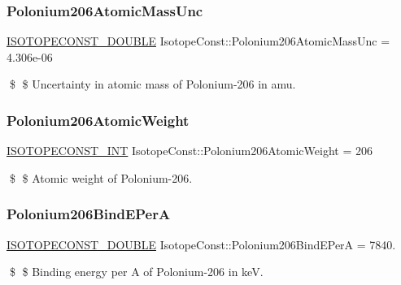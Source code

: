 \subsubsection{\texorpdfstring{Polonium206\+Atomic\+Mass\+Unc}{Polonium206AtomicMassUnc}}
{\footnotesize\ttfamily \mbox{\hyperlink{group___isotope_const-_macros_ga8f45a7272ce02c0b4c65c44636ed719a}{I\+S\+O\+T\+O\+P\+E\+C\+O\+N\+S\+T\+\_\+\+D\+O\+U\+B\+LE}} Isotope\+Const\+::\+Polonium206\+Atomic\+Mass\+Unc = 4.\+306e-\/06}

\$ \$ Uncertainty in atomic mass of Polonium-\/206 in amu. \mbox{\label{group___isotope_const-_polonium-_po206_ga55873615923500a46ce5d4bd2b4f03e9}} 
\subsubsection{\texorpdfstring{Polonium206\+Atomic\+Weight}{Polonium206AtomicWeight}}
{\footnotesize\ttfamily \mbox{\hyperlink{group___isotope_const-_macros_ga5f18360b3e99483a35c32d789e62621c}{I\+S\+O\+T\+O\+P\+E\+C\+O\+N\+S\+T\+\_\+\+I\+NT}} Isotope\+Const\+::\+Polonium206\+Atomic\+Weight = 206}

\$ \$ Atomic weight of Polonium-\/206. \mbox{\label{group___isotope_const-_polonium-_po206_gaf8ec9079da7ca5d24fc6d564b37ed29b}} 
\subsubsection{\texorpdfstring{Polonium206\+Bind\+E\+PerA}{Polonium206BindEPerA}}
{\footnotesize\ttfamily \mbox{\hyperlink{group___isotope_const-_macros_ga8f45a7272ce02c0b4c65c44636ed719a}{I\+S\+O\+T\+O\+P\+E\+C\+O\+N\+S\+T\+\_\+\+D\+O\+U\+B\+LE}} Isotope\+Const\+::\+Polonium206\+Bind\+E\+PerA = 7840.}

\$ \$ Binding energy per A of Polonium-\/206 in keV. \mbox{\label{group___isotope_const-_polonium-_po206_gaf0346d169a3274a3e4e7b45aef98c4ba}} 
